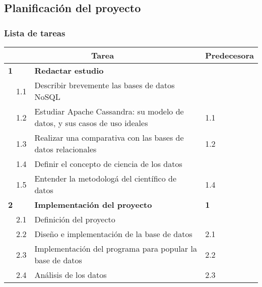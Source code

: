\subsection{Planificación del proyecto}
\label{subsec:planificació}


\subsubsection{Lista de tareas}
\label{subsubsec:tasklist}

\begin{table}[!htb]
\centering
\begin{tabular}{l|l|l|l|l|l|}
\hline
\multicolumn{5}{|c|}{Tarea}                                                                                                       & Predecesora \\ \hline
\multicolumn{2}{|l|}{\textbf{1}} & \multicolumn{3}{l|}{\textbf{Redactar  estudio}}                                                &             \\ \hline
              & 1.1              & \multicolumn{3}{l|}{Describir brevemente las bases de datos NoSQL}                             &             \\ \cline{2-6} 
              & 1.2              & \multicolumn{3}{l|}{Estudiar Apache Cassandra: su modelo de datos, y sus casos de uso ideales} & 1.1         \\ \cline{2-6} 
              & 1.3              & \multicolumn{3}{l|}{Realizar una comparativa con las bases de datos relacionales}              & 1.2         \\ \cline{2-6} 
              & 1.4              & \multicolumn{3}{l|}{Definir el concepto de ciencia de los datos}                               &             \\ \cline{2-6} 
              & 1.5              & \multicolumn{3}{l|}{Entender la metodologá del científico de datos}                            & 1.4         \\ \hline
\multicolumn{2}{|l|}{\textbf{2}} & \multicolumn{3}{l|}{\textbf{Implementación del proyecto}}                                      & \textbf{1}  \\ \hline
              & 2.1              & \multicolumn{3}{l|}{Definición del proyecto}                                                   &             \\ \cline{2-6} 
              & 2.2              & \multicolumn{3}{l|}{Diseño e implementación de la base de datos}                               & 2.1         \\ \cline{2-6} 
              & 2.3              & \multicolumn{3}{l|}{Implementación del programa para popular la base de datos}                 & 2.2         \\ \cline{2-6} 
              & 2.4              & \multicolumn{3}{l|}{Análisis de los datos}                                                     & 2.3         \\ \cline{2-6} 
\end{tabular}
\end{table}


